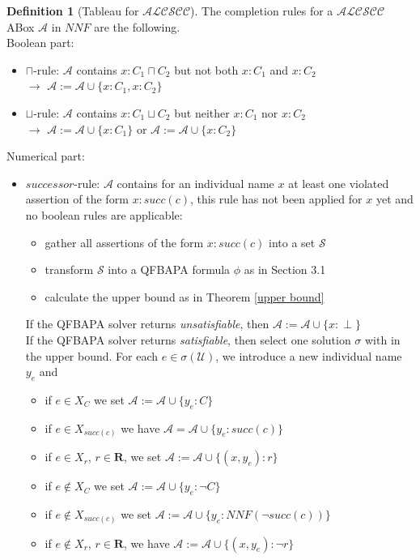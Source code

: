 \documentclass{book}
\theoremstyle{break}
\theoremstyle{definition}
\newtheorem{mydef}{Definition}
\begin{document}
\begin{mydef}[Tableau for $\mathcal{ALCSCC}$]
The completion rules for a $\mathcal{ALCSCC}$ ABox $\mathcal{A}$ in $NNF$ are the following.\\
Boolean part:
\begin{itemize}
\item\label{cap} $\sqcap$-rule: $\mathcal{A}$ contains $x:C_1\sqcap C_2$ but not both $x:C_1$ and $x:C_2$\\
$\rightarrow$ $\mathcal{A}:=\mathcal{A}\cup\{x:C_1, x:C_2\}$
\item\label{cup} $\sqcup$-rule: $\mathcal{A}$ contains $x:C_1\sqcup C_2$ but neither $x:C_1$ nor $x:C_2$\\
$\rightarrow$ $\mathcal{A}:=\mathcal{A}\cup\{x:C_1\}$ or $\mathcal{A}:=\mathcal{A}\cup\{x:C_2\}$
\end{itemize}
Numerical part:
\begin{itemize}
\item\label{succ} $successor$-rule: $\mathcal{A}$ contains for an individual name $x$ at least one violated assertion of the form $x:succ(c)$, this rule has not been applied for $x$ yet and no boolean rules are applicable:
\begin{itemize}
\item gather all assertions of the form $x:succ(c)$ into a set $\mathcal{S}$
\item transform $\mathcal{S}$ into a QFBAPA formula $\phi$ as in Section 3.1
\item calculate the upper bound as in Theorem \ref{upper bound}
\end{itemize}
If the QFBAPA solver returns \textit{unsatisfiable}, then $\mathcal{A}:=\mathcal{A}\cup\{x:\perp\}$\\
If the QFBAPA solver returns \textit{satisfiable}, then select one solution $\sigma$ with in the upper bound. For each $e\in\sigma(\mathcal{U})$, we introduce a new individual name $y_e$ and
\begin{itemize}
\item if $e\in X_C$ we set $\mathcal{A}:=\mathcal{A}\cup\{y_e:C\}$
\item if $e\in X_{succ(c)}$ we have $\mathcal{A}=\mathcal{A}\cup\{y_e:succ(c)\}$
\item if $e\in X_r$, $r\in\mathbf{R}$, we set $\mathcal{A}:=\mathcal{A}\cup\{(x,y_e):r\}$
\item if $e\notin X_C$ we set $\mathcal{A}:=\mathcal{A}\cup\{y_e:\neg C\}$
\item if $e\notin X_{succ(c)}$ we set $\mathcal{A}:=\mathcal{A}\cup\{y_e: NNF(\neg succ(c))\}$
\item if $e\notin X_r$, $r\in\mathbf{R}$, we have $\mathcal{A}:=\mathcal{A}\cup\{(x,y_e):\neg r\}$
\end{itemize}
\end{itemize}
\end{mydef}
\end{document}
